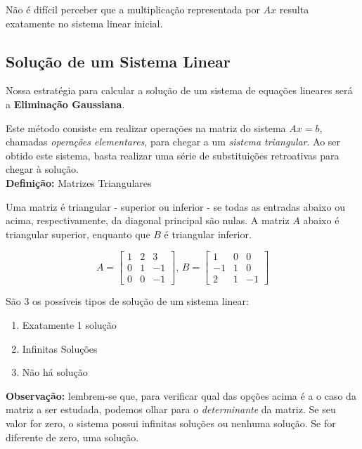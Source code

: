 \documentclass[12pt]{article}
\begin{document}
Não é difícil perceber que a multiplicação representada por $Ax$ resulta exatamente no sistema linear inicial.

\subsection{Solução de um Sistema Linear}

Nossa estratégia para calcular a solução de um sistema de equações lineares será a \textbf{Eliminação Gaussiana}. 

Este método consiste em realizar operações na matriz do sistema $Ax=b$, chamadas \textit{operações elementares}, para chegar a um \textit{sistema triangular}. Ao ser obtido este sistema, basta realizar uma série de substituições retroativas para chegar à solução.\\

\textbf{Definição:} Matrizes Triangulares

Uma matriz é triangular - superior ou inferior - se todas as entradas abaixo ou acima, respectivamente, da diagonal principal são nulas. A matriz $A$ abaixo é triangular superior, enquanto que $B$ é triangular inferior.

\begin{equation*}
	A=
	\begin{bmatrix}
		1 & 2 & 3\\
		0 & 1 & -1\\
		0 & 0 & -1
	\end{bmatrix} \mbox{, } 
	B=
	\begin{bmatrix}
		1 & 0 &0\\
		-1 & 1 & 0\\
		2 & 1 & -1
	\end{bmatrix}
\end{equation*}

São 3 os possíveis tipos de solução de um sistema linear:
\begin{enumerate}
	\item Exatamente 1 solução
	\item Infinitas Soluções
	\item Não há solução
\end{enumerate}

\textbf{Observação:} lembrem-se que, para verificar qual das opções acima é a o caso da matriz a ser estudada, podemos olhar para o \textit{determinante} da matriz. Se seu valor for zero, o sistema possui infinitas soluções ou nenhuma solução. Se for diferente de zero, uma solução.
\end{document}
